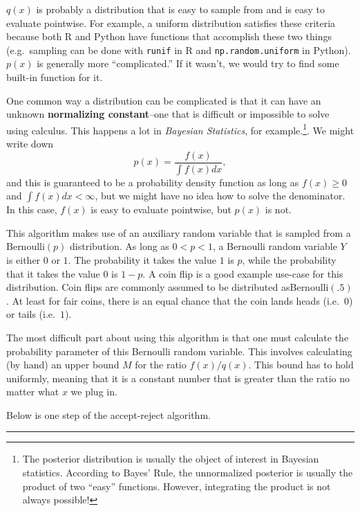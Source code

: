 \documentclass[
  12pt,
]{krantz}
\begin{document}
\(q(x)\) is probably a distribution that is easy to sample from and is easy to evaluate pointwise. For example, a uniform distribution satisfies these criteria because both R and Python have functions that accomplish these two things (e.g.~sampling can be done with \texttt{runif} in R and \texttt{np.random.uniform} in Python). \(p(x)\) is generally more ``complicated.'' If it wasn't, we would try to find some built-in function for it.

One common way a distribution can be complicated is that it can have an unknown \textbf{normalizing constant}--one that is difficult or impossible to solve using calculus. This happens a lot in \emph{Bayesian Statistics}, for example.\footnote{The posterior distribution is usually the object of interest in Bayesian statistics. According to Bayes' Rule, the unnormalized posterior is usually the product of two ``easy'' functions. However, integrating the product is not always possible!}. We might write down
\[
p(x) = \frac{f(x)}{\int f(x) dx},
\]
and this is guaranteed to be a probability density function as long as \(f(x) \ge 0\) and \(\int f(x) dx < \infty\), but we might have no idea how to solve the denominator. In this case, \(f(x)\) is easy to evaluate pointwise, but \(p(x)\) is not.

This algorithm makes use of an auxiliary random variable that is sampled from a \(\text{Bernoulli}(p)\) distribution. As long as \(0 < p < 1\), a Bernoulli random variable \(Y\) is either \(0\) or \(1\). The probability it takes the value \(1\) is \(p\), while the probability that it takes the value \(0\) is \(1-p\). A coin flip is a good example use-case for this distribution. Coin flips are commonly assumed to be distributed as\(\text{Bernoulli}(.5)\). At least for fair coins, there is an equal chance that the coin lands heads (i.e.~\(0\)) or tails (i.e.~\(1\)).

The most difficult part about using this algorithm is that one must calculate the probability parameter of this Bernoulli random variable. This involves calculating (by hand) an upper bound \(M\) for the ratio \(f(x) / q(x)\). This bound has to hold uniformly, meaning that it is a constant number that is greater than the ratio no matter what \(x\) we plug in.

Below is one step of the accept-reject algorithm.

\begin{center}\rule{0.5\linewidth}{0.5pt}\end{center}
\end{document}
